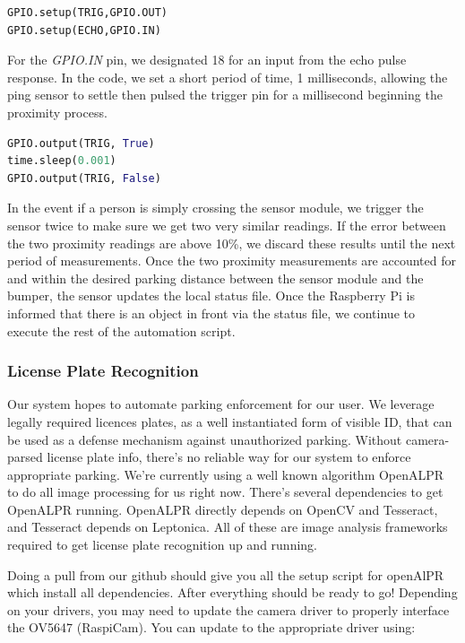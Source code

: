 \begin{lstlisting}[language=Python]
GPIO.setup(TRIG,GPIO.OUT)
GPIO.setup(ECHO,GPIO.IN)
\end{lstlisting}
For the \textit{GPIO.IN} pin, we designated 18 for an input from the echo pulse response.
In the code, we set a short period of time, 1 milliseconds, allowing the ping sensor to settle then pulsed the trigger pin for a millisecond beginning the proximity process.

\begin{lstlisting}[language=Python]
GPIO.output(TRIG, True)
time.sleep(0.001)
GPIO.output(TRIG, False)
\end{lstlisting}

In the event if a person is simply crossing the sensor module, we trigger the sensor twice to make sure we get two very similar readings. 
If the error between the two proximity readings are above 10\%, we discard these results until the next period of measurements.
Once the two proximity measurements are accounted for and within the desired parking distance between the sensor module and the bumper, the sensor updates the local status file.
Once the Raspberry Pi is informed that there is an object in front via the status file, we continue to execute the rest of the automation script.

\subsubsection{License Plate Recognition}
Our system hopes to automate parking enforcement for our user. 
We leverage legally required licences plates, as a well instantiated form of visible ID, that can be used as a defense mechanism against unauthorized parking. Without camera-parsed license plate info, there’s no reliable way for our system to enforce appropriate parking. We’re currently using a well known algorithm OpenALPR to do all image processing for us right now. 
There's several dependencies to get OpenALPR running. OpenALPR directly depends on OpenCV and Tesseract, and Tesseract depends on Leptonica. All of these are image analysis frameworks required to get license plate recognition up and running.

Doing a pull from our github should give you all the setup script for openAlPR which install all dependencies. After everything should be ready to go! Depending on your drivers, you may need to update the camera driver to properly interface the OV5647 (RaspiCam). You can update to the appropriate driver using:

